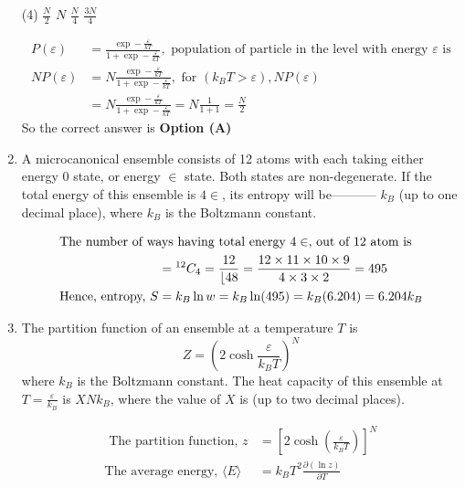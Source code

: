 \begin{enumerate}
	{}
	\begin{tasks}(4)
		\task[\textbf{A.}] $\frac{N}{2}$
		\task[\textbf{B.}] $N$
		\task[\textbf{C.}] $\frac{N}{4}$
		\task[\textbf{D.}] $\frac{3 N}{4}$
	\end{tasks}
	\begin{answer}
		\begin{align*}
		P(\varepsilon)&=\frac{\exp -\frac{\varepsilon}{k T}}{1+\exp -\frac{\varepsilon}{k T}},\text{ population of particle in the level with energy $\varepsilon$ is}\\
		N P(\varepsilon)&=N \frac{\exp -\frac{\varepsilon}{k T}}{1+\exp -\frac{\varepsilon}{k T}},\text{ for }\left(k_{B} T>\varepsilon\right), N P(\varepsilon)\\&=N \frac{\exp -\frac{\varepsilon}{k T}}{1+\exp -\frac{\varepsilon}{k T}}=N \frac{1}{1+1}=\frac{N}{2}
		\end{align*}
		So the correct answer is \textbf{Option (A)}
	\end{answer}	
	\item  A microcanonical ensemble consists of 12 atoms with each taking either energy 0 state, or energy $\in$ state. Both states are non-degenerate. If the total energy of this ensemble is $4 \in$, its entropy will be----------- $k_{B}$ (up to one decimal place), where $k_{B}$ is the Boltzmann constant.
	{}
	\begin{answer}
		\begin{align*}
		\intertext{The number of ways having total energy $4 \in$, out of 12 atom is}
		&={ }^{12} C_{4}=\frac{12}{\lfloor 48}=\frac{12 \times 11 \times 10 \times 9}{4 \times 3 \times 2}=495\\
		\text{Hence, entropy, }S&=k_{B} \ln w=k_{B} \ln (495)=k_{B}(6.204)=6.204 k_{B}
		\end{align*}
	\end{answer}	
	\item  The partition function of an ensemble at a temperature $T$ is
	$$
	Z=\left(2 \cosh \frac{\varepsilon}{k_{B} T}\right)^{N}
	$$
	where $k_{B}$ is the Boltzmann constant. The heat capacity of this ensemble at $T=\frac{\varepsilon}{k_{B}}$ is $X N k_{B}$, where the value of $X$ is (up to two decimal places).
	{}
	\begin{answer}
		\begin{align*}
		\text{	The partition function, }z&=\left[2 \cosh \left(\frac{\varepsilon}{k_{B} T}\right)\right]^{N}\\
		\text{The average energy, }\langle E\rangle&=k_{B} T^{2} \frac{\partial(\ln z)}{\partial T}\\

\end{align*}
\end{answer}
\end{enumerate}
